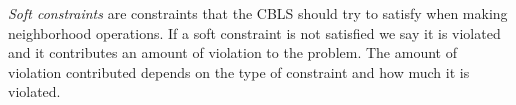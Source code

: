 \emph{Soft constraints} are constraints that the CBLS should try to satisfy when making neighborhood operations. If a 
soft constraint is not satisfied we say it is violated and it contributes an amount of violation to the problem. The 
amount of violation contributed depends on the type of constraint and how much it is violated. \\ 